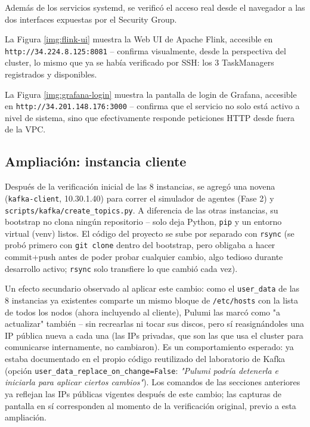 Además de los servicios systemd, se verificó el acceso real desde el navegador a las dos interfaces expuestas por el Security Group.

La Figura \ref{img:flink-ui} muestra la Web UI de Apache Flink, accesible en \texttt{http://34.224.8.125:8081} -- confirma visualmente, desde la perspectiva del cluster, lo mismo que ya se había verificado por SSH: los 3 TaskManagers registrados y disponibles.


La Figura \ref{img:grafana-login} muestra la pantalla de login de Grafana, accesible en \texttt{http://34.201.148.176:3000} -- confirma que el servicio no solo está activo a nivel de sistema, sino que efectivamente responde peticiones HTTP desde fuera de la VPC.


\subsection{Ampliación: instancia cliente}
\label{subsec:ampliacion-cliente}

Después de la verificación inicial de las 8 instancias, se agregó una novena (\texttt{kafka-client}, 10.30.1.40) para correr el simulador de agentes (Fase 2) y \texttt{scripts/kafka/create\_topics.py}. A diferencia de las otras instancias, su bootstrap no clona ningún repositorio -- solo deja Python, \texttt{pip} y un entorno virtual (venv) listos. El código del proyecto se sube por separado con \texttt{rsync} (se probó primero con \texttt{git clone} dentro del bootstrap, pero obligaba a hacer commit+push antes de poder probar cualquier cambio, algo tedioso durante desarrollo activo; \texttt{rsync} solo transfiere lo que cambió cada vez).

Un efecto secundario observado al aplicar este cambio: como el \texttt{user\_data} de las 8 instancias ya existentes comparte un mismo bloque de \texttt{/etc/hosts} con la lista de todos los nodos (ahora incluyendo al cliente), Pulumi las marcó como "a actualizar" también -- sin recrearlas ni tocar sus discos, pero sí reasignándoles una IP pública nueva a cada una (las IPs privadas, que son las que usa el cluster para comunicarse internamente, no cambiaron). Es un comportamiento esperado: ya estaba documentado en el propio código reutilizado del laboratorio de Kafka (opción \texttt{user\_data\_replace\_on\_change=False}: \textit{"Pulumi podría detenerla e iniciarla para aplicar ciertos cambios"}). Los comandos de las secciones anteriores ya reflejan las IPs públicas vigentes después de este cambio; las capturas de pantalla en sí corresponden al momento de la verificación original, previo a esta ampliación.

